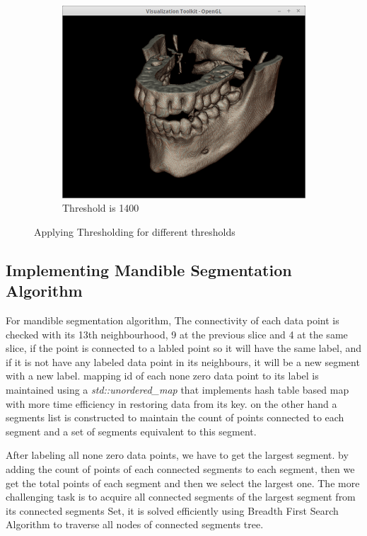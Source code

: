 \documentclass[10pt, b5paper]{article}
\begin{document}
\begin{figure}
\begin{subfigure}[b]{0.33\textwidth}
        \centering
        \includegraphics[width=\textwidth]{T1400}
        \caption{Threshold is 1400}
    \end{subfigure}
    \caption{Applying Thresholding for different thresholds}
    \label{fig:Thresholding}
\end{figure}

\subsection{Implementing Mandible Segmentation Algorithm}
For mandible segmentation algorithm, The connectivity of each data point is checked with its 13th neighbourhood, 9 at the previous slice and 4 at the same slice, if the point is connected to a labled point so it will have the same label, and if it is not have any labeled data point in its neighbours, it will be a new segment with a new label. mapping id of  each none zero data point to its label is maintained using a \textit{std::unordered\_map} that implements hash table based map with more time efficiency in restoring data from its key. on the other hand a segments list is constructed to maintain the count of points connected to each segment and a set of segments equivalent to this segment.

After labeling all none zero data points, we have to get the largest segment. by adding the count of points of each connected segments to each segment, then we get the total points of each segment and then we select the largest one. The more challenging task is to acquire all connected segments of the largest segment from its connected segments Set, it is solved efficiently using Breadth First Search Algorithm to traverse all nodes of connected segments tree. 
\end{document}
